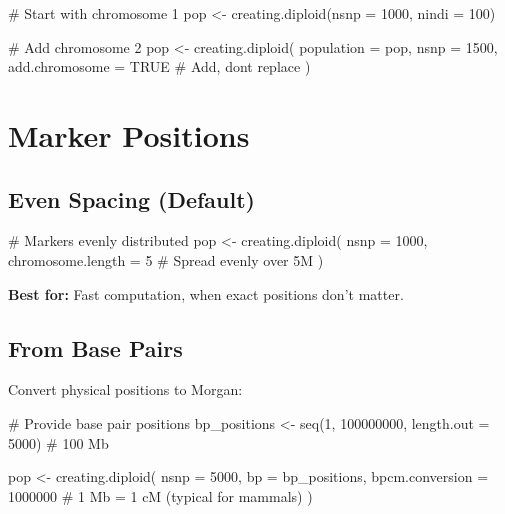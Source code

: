 \documentclass[
  letterpaper,
]{book}
\newenvironment{Shaded}{\begin{snugshade}}{\end{snugshade}}
\newcommand{\AttributeTok}[1]{\textcolor[rgb]{0.40,0.45,0.13}{#1}}
\newcommand{\CommentTok}[1]{\textcolor[rgb]{0.37,0.37,0.37}{#1}}
\newcommand{\ConstantTok}[1]{\textcolor[rgb]{0.56,0.35,0.01}{#1}}
\newcommand{\DecValTok}[1]{\textcolor[rgb]{0.68,0.00,0.00}{#1}}
\newcommand{\FunctionTok}[1]{\textcolor[rgb]{0.28,0.35,0.67}{#1}}
\newcommand{\NormalTok}[1]{\textcolor[rgb]{0.00,0.23,0.31}{#1}}
\newcommand{\OtherTok}[1]{\textcolor[rgb]{0.00,0.23,0.31}{#1}}
\begin{document}
\begin{Shaded}
\begin{Highlighting}[]
\CommentTok{\# Start with chromosome 1}
\NormalTok{pop }\OtherTok{\textless{}{-}} \FunctionTok{creating.diploid}\NormalTok{(}\AttributeTok{nsnp =} \DecValTok{1000}\NormalTok{, }\AttributeTok{nindi =} \DecValTok{100}\NormalTok{)}

\CommentTok{\# Add chromosome 2}
\NormalTok{pop }\OtherTok{\textless{}{-}} \FunctionTok{creating.diploid}\NormalTok{(}
  \AttributeTok{population =}\NormalTok{ pop,}
  \AttributeTok{nsnp =} \DecValTok{1500}\NormalTok{,}
  \AttributeTok{add.chromosome =} \ConstantTok{TRUE}  \CommentTok{\# Add, don\textquotesingle{}t replace}
\NormalTok{)}
\end{Highlighting}
\end{Shaded}

\section{Marker Positions}\label{sec-marker-positions}

\subsection{Even Spacing (Default)}\label{even-spacing-default}

\begin{Shaded}
\begin{Highlighting}[]
\CommentTok{\# Markers evenly distributed}
\NormalTok{pop }\OtherTok{\textless{}{-}} \FunctionTok{creating.diploid}\NormalTok{(}
  \AttributeTok{nsnp =} \DecValTok{1000}\NormalTok{,}
  \AttributeTok{chromosome.length =} \DecValTok{5}  \CommentTok{\# Spread evenly over 5M}
\NormalTok{)}
\end{Highlighting}
\end{Shaded}

\textbf{Best for:} Fast computation, when exact positions don't matter.

\subsection{From Base Pairs}\label{from-base-pairs}

Convert physical positions to Morgan:

\begin{Shaded}
\begin{Highlighting}[]
\CommentTok{\# Provide base pair positions}
\NormalTok{bp\_positions }\OtherTok{\textless{}{-}} \FunctionTok{seq}\NormalTok{(}\DecValTok{1}\NormalTok{, }\DecValTok{100000000}\NormalTok{, }\AttributeTok{length.out =} \DecValTok{5000}\NormalTok{)  }\CommentTok{\# 100 Mb}

\NormalTok{pop }\OtherTok{\textless{}{-}} \FunctionTok{creating.diploid}\NormalTok{(}
  \AttributeTok{nsnp =} \DecValTok{5000}\NormalTok{,}
  \AttributeTok{bp =}\NormalTok{ bp\_positions,}
  \AttributeTok{bpcm.conversion =} \DecValTok{1000000}   \CommentTok{\# 1 Mb = 1 cM (typical for mammals)}
\NormalTok{)}
\end{Highlighting}
\end{Shaded}
\end{document}
